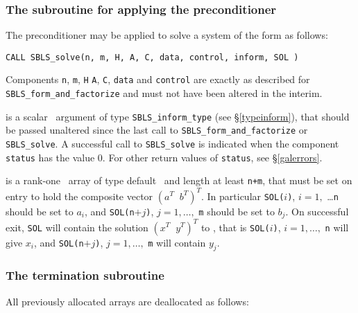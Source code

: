 \documentclass{galahad}
\newcommand{\packagename}{SBLS}
\begin{document}
\subsubsection{The subroutine for applying the preconditioner}
The preconditioner may be applied to solve a system of the
form  as follows:
\vspace*{1mm}

\hspace{8mm}
{\tt CALL \packagename\_solve(n, m, H, A, C, data, control, inform, SOL )}
\vspace*{1mm}

\noindent
Components {\tt n}, {\tt m},  {\tt H} {\tt A}, {\tt C}, {\tt data} and
{\tt control} are exactly as described for
{\tt \packagename\_form\_and\_factorize} and must not have been
altered in the interim.

\vspace*{-3mm}
\begin{description}

 is a scalar \intentout\ argument of type
{\tt \packagename\_inform\_type}
(see \S\ref{typeinform}), that should be passed unaltered since
the last call to {\tt \packagename\_form\_and\_factorize} or
{\tt \packagename\_solve}.  A successful call to
{\tt \packagename\_solve}
is indicated when the  component {\tt status} has the value 0.
For other return values of {\tt status}, see \S\ref{galerrors}.

 is a rank-one  \intentinout\ array of type default \real\
and length at least {\tt n+m}, that must be set on entry to hold
the composite vector $( a^T \;\; b^T)^T$.
In particular {\tt SOL(}$i${\tt )}, $i = 1,$ \ldots {\tt n} should be
set to $a_i$, and
{\tt SOL(n}$+j${\tt )}, $j = 1, \ldots,$ {\tt m} should be
set to $b_j$. On successful exit, {\tt SOL}
will contain the solution $( x^T \;\; y^T)^T$ to , that is
{\tt SOL(}$i${\tt )}, $i = 1, \ldots,$ {\tt n} will give
$x_i$, and  {\tt SOL(n}$+j${\tt )}, $j = 1,\ldots,$ {\tt m} will contain
$y_j$.



\end{description}


\subsubsection{The  termination subroutine}
All previously allocated arrays are deallocated as follows:
\vspace*{1mm}
\end{document}
